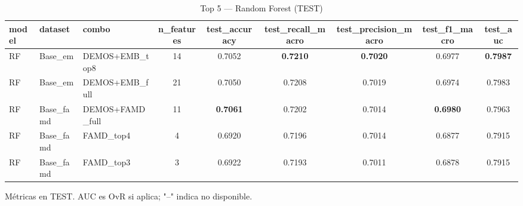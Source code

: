 
\begin{table}[ht]
\centering
\begin{threeparttable}
\caption{Top 5 — Random Forest (TEST)}
\label{tab:rf_top5}
\begin{tabular}{@{} l l l S S S S S S @{}}
\toprule
model & dataset & combo & n_features & test_accuracy & test_recall_macro & test_precision_macro & test_f1_macro & test_auc \\
\midrule
RF & Base_em & DEMOS+EMB_top8 & 14 & 0.7052 & \textbf{0.7210} & \textbf{0.7020} & 0.6977 & \textbf{0.7987} \\
RF & Base_em & DEMOS+EMB_full & 21 & 0.7050 & 0.7208 & 0.7019 & 0.6974 & 0.7983 \\
RF & Base_famd & DEMOS+FAMD_full & 11 & \textbf{0.7061} & 0.7202 & 0.7014 & \textbf{0.6980} & 0.7963 \\
RF & Base_famd & FAMD_top4 & 4 & 0.6920 & 0.7196 & 0.7014 & 0.6877 & 0.7915 \\
RF & Base_famd & FAMD_top3 & 3 & 0.6922 & 0.7193 & 0.7011 & 0.6878 & 0.7915 \\
\bottomrule
\end{tabular}

\begin{tablenotes}\footnotesize
\item Métricas en TEST. AUC es OvR si aplica; "--" indica no disponible.
\end{tablenotes}
\end{threeparttable}
\end{table}
